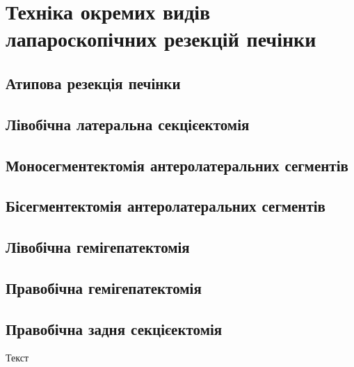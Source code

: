 \chapter{Техніка окремих видів лапароскопічних резекцій печінки}
\begin{refsection}
\section{Атипова резекція печінки}

\section{Лівобічна латеральна секцієектомія}

\section{Моносегментектомія антеролатеральних сегментів}

\section{Бісегментектомія антеролатеральних сегментів}

\section{Лівобічна гемігепатектомія}

\section{Правобічна гемігепатектомія}

\section{Правобічна задня секцієектомія}

Текст
\printbibliography [heading=subbibliography]
\end{refsection}